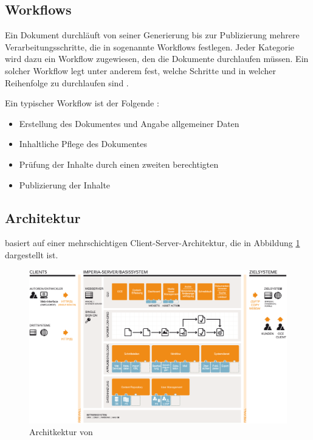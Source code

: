     \subsection{Workflows}
        Ein Dokument durchläuft von seiner Generierung bis zur
        Publizierung mehrere Verarbeitungsschritte,
        die in {\imperia} sogenannte Workflows festlegen.
        Jeder Kategorie wird dazu ein Workflow zugewiesen,
        den die Dokumente durchlaufen müssen.
        Ein solcher Workflow legt unter anderem fest,
        welche Schritte und in welcher Reihenfolge
        zu durchlaufen sind
        \cite[Kapitel 1.1.5]{imperia:ecmd}.

        Ein typischer Workflow ist der Folgende
        \cite[Kapitel 1.1]{imperia:ecmd}:

        \begin{itemize}
            \item Erstellung des Dokumentes und Angabe allgemeiner Daten
            \item Inhaltliche Pflege des Dokumentes
            \item Prüfung der Inhalte durch einen zweiten berechtigten \editor
            \item Publizierung der Inhalte
        \end{itemize}

    \subsection{Architektur}
        \label{section:imperiaArch}
        {\imperia} basiert auf einer mehrschichtigen Client-Server-Architektur,
        die in Abbildung \ref{image:imperiaArchitektur} dargestellt ist.

        \begin{figure}
            \centering
            \includegraphics[width=\textwidth]{../resources/imperia/architektur.png}
            \caption{Architkektur von {\imperia} \cite{imperia:ecmd}}
            \label{image:imperiaArchitektur}
        \end{figure}

